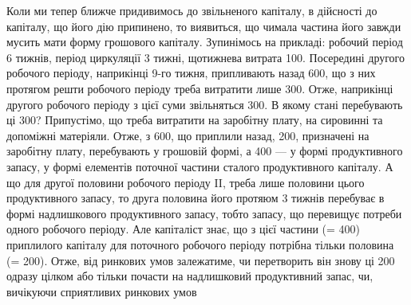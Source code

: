 Коли ми тепер ближче придивимось до звільненого капіталу, в дійсності
до капіталу, що його дію припинено, то виявиться, що чимала
частина його завжди мусить мати форму грошового капіталу. Зупинімось
на прикладі: робочий період 6 тижнів, період циркуляції 3 тижні, щотижнева
витрата 100. Посередині другого робочого періоду,
наприкінці 9-го тижня, припливають назад 600, що з них протягом
решти робочого періоду треба витратити лише 300.
Отже, наприкінці другого робочого періоду з цієї суми звільняться
300. В якому стані перебувають ці 300? Припустімо,
що  треба витратити на заробітну плату,  на сировинні та допоміжні
матеріяли. Отже, з 600, що приплили назад, 200, призначені
на заробітну плату, перебувають у грошовій формі, а 400 — у формі продуктивного запасу, у формі елементів поточної
частини сталого продуктивного капіталу. А що для другої половини
робочого періоду II, треба лише половини цього продуктивного запасу,
то друга половина його протяюм 3 тижнів перебуває в формі надлишкового
продуктивного запасу, тобто запасу, що перевищує потреби одного
робочого періоду. Але капіталіст знає, що з цієї частини (= 400)
приплилого капіталу для поточного робочого періоду потрібна тільки
половина (= 200). Отже, від ринкових умов залежатиме, чи
перетворить він знову ці 200 одразу цілком або тільки почасти на
надлишковий продуктивний запас, чи, вичікуючи сприятливих ринкових умов
\parbreak{}  %
